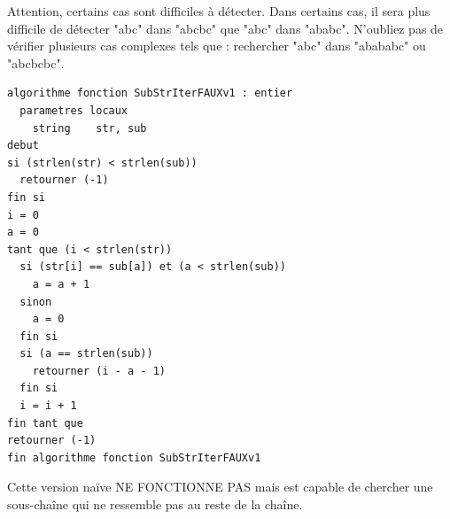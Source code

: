 \documentclass[11pt,a4paper]{article}
\begin{document}
\vfillLast


\newpage

\vfillFirst



Attention, certains cas sont difficiles à détecter.
Dans certains cas, il sera plus difficile de détecter "abc" dans "abcbc" que "abc" dans "ababc".
N'oubliez pas de vérifier plusieurs cas complexes tels que : rechercher "abc" dans "abababc" ou "abcbcbc".

\begin{table}[ht!]
  \centering
\begin{lstlisting}[style=algorithmique]
algorithme fonction SubStrIterFAUXv1 : entier
  parametres locaux
    string    str, sub
debut
si (strlen(str) < strlen(sub))
  retourner (-1)
fin si
i = 0
a = 0
tant que (i < strlen(str))
  si (str[i] == sub[a]) et (a < strlen(sub))
    a = a + 1
  sinon
    a = 0
  fin si
  si (a == strlen(sub))
    retourner (i - a - 1)
  fin si
  i = i + 1
fin tant que
retourner (-1)
fin algorithme fonction SubStrIterFAUXv1 \end{lstlisting}
  \caption{Cette version naïve NE FONCTIONNE PAS mais est capable de chercher une sous-chaîne qui ne ressemble pas au reste de la chaîne.}
\end{table}


\vfillLast

\clearpage

\vfillFirst
\end{document}
